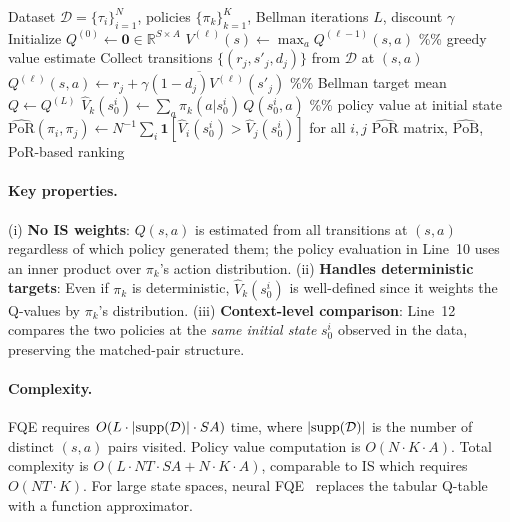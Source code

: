 \documentclass[10pt]{article}
\theoremstyle{plain}
\theoremstyle{definition}
\theoremstyle{remark}
\newcommand{\R}{\mathbb{R}}
\newcommand{\PoR}{\mathrm{PoR}}
\newcommand{\PoB}{\mathrm{PoB}}
\newcommand{\calD}{\mathcal{D}}
\begin{document}
\begin{algorithm}[t]
  \caption{PoR-Model: Model-Based PoR via Fitted Q-Evaluation}
  \label{alg:por_model}
  \begin{algorithmic}[1]
    \Require Dataset $\calD=\{\tau_i\}_{i=1}^N$, policies $\{\pi_k\}_{k=1}^K$,
             Bellman iterations $L$, discount $\gamma$
    \State Initialize $Q^{(0)}\leftarrow\mathbf{0}\in\R^{S\times A}$
      \State $V^{(\ell)}(s)\leftarrow\max_a Q^{(\ell-1)}(s,a)$ \quad\%\% greedy value estimate
        \State Collect transitions $\{(r_j,s'_j,d_j)\}$ from $\calD$ at $(s,a)$
        \State $Q^{(\ell)}(s,a)\leftarrow \overline{r_j + \gamma(1-d_j)V^{(\ell)}(s'_j)}$
              \quad\%\% Bellman target mean
      \EndFor
    \EndFor
    \State $Q\leftarrow Q^{(L)}$
      \State $\hat{V}_k(s_0^i)\leftarrow\sum_{a}\pi_k(a|s_0^i)\,Q(s_0^i,a)$
             \quad\%\% policy value at initial state
    \EndFor
    \State $\widehat{\PoR}(\pi_i,\pi_j)\leftarrow N^{-1}\sum_i
           \mathbf{1}[\hat{V}_i(s_0^i)>\hat{V}_j(s_0^i)]$ \quad for all $i,j$
    \State \Return $\widehat{\PoR}$ matrix, $\widehat{\PoB}$, PoR-based ranking
  \end{algorithmic}
\end{algorithm}

\paragraph{Key properties.}
(i) \textbf{No IS weights}: $Q(s,a)$ is estimated from all transitions at
$(s,a)$ regardless of which policy generated them; the policy evaluation in
Line~10 uses an inner product over $\pi_k$'s action distribution.
(ii) \textbf{Handles deterministic targets}: Even if $\pi_k$ is deterministic,
$\hat{V}_k(s_0^i)$ is well-defined since it weights the Q-values by $\pi_k$'s
distribution.
(iii) \textbf{Context-level comparison}: Line~12 compares the two policies at
the \emph{same initial state} $s_0^i$ observed in the data, preserving the
matched-pair structure.

\paragraph{Complexity.}
FQE requires $O(L\cdot|{\rm supp}(\calD)|\cdot SA)$ time, where
$|{\rm supp}(\calD)|$ is the number of distinct $(s,a)$ pairs visited.
Policy value computation is $O(N\cdot K\cdot A)$.  Total complexity is
$O(L\cdot NT\cdot SA + N\cdot K\cdot A)$, comparable to IS which requires
$O(NT\cdot K)$.  For large state spaces, neural FQE~\citep{le2019batch}
replaces the tabular Q-table with a function approximator.
\end{document}
